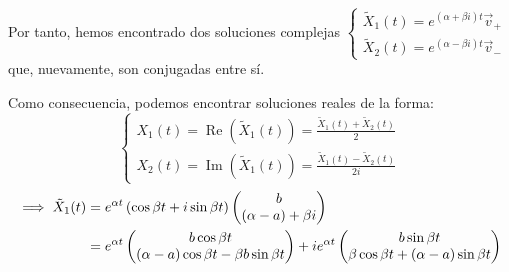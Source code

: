 \begin{itemize}
	      Por tanto, hemos encontrado dos soluciones complejas $\begin{cases}
			      \tilde{X}_1(t) = e^{(\alpha + \beta i)t} \vec{v}_+ \\
			      \tilde{X}_2(t) = e^{(\alpha - \beta i)t} \vec{v}_-
		      \end{cases}$ \\ que, nuevamente, son conjugadas entre sí.

	      Como consecuencia, podemos encontrar soluciones reales de la forma:
	      \[\begin{cases}
			      X_1(t) = \operatorname{Re}\left(\tilde{X}_1(t)\right) = \frac{\tilde{X}_1(t) + \tilde{X}_2(t)}{2} \\
			      X_2(t) = \operatorname{Im}\left(\tilde{X}_1(t)\right) = \frac{\tilde{X}_1(t) - \tilde{X}_2(t)}{2i}
		      \end{cases}\]
	      \[\begin{aligned}%
			      \implies \til{X}_1(t) & = e^{\alpha t} \left(\cos{\beta t} + i \sin{\beta t}\right) \begin{pmatrix}
				                                                                                          b \\
				                                                                                          (\alpha-a) + \beta i
			                                                                                          \end{pmatrix}             \\
			                            & = e^{\alpha t} \begin{pmatrix}
				                                             b\cos{\beta t} \\
				                                             (\alpha-a)\cos{\beta t} - \beta b \sin{\beta t}
			                                             \end{pmatrix} + i e^{\alpha t} \begin{pmatrix}
				                                                                            b\sin{\beta t} \\
				                                                                            \beta \cos {\beta t} + (\alpha-a)\sin{\beta t}
			                                                                            \end{pmatrix}
		      \end{aligned}\]
\end{itemize}

